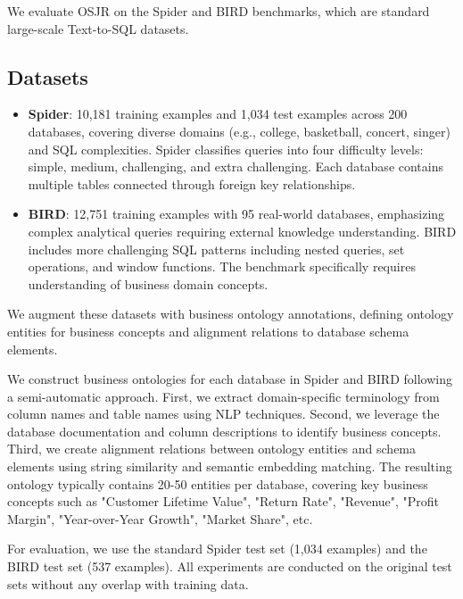 \documentclass[sigconf, nonatbib]{acmart}
\begin{document}
We evaluate OSJR on the Spider and BIRD benchmarks, which are standard large-scale Text-to-SQL datasets.

\subsection{Datasets}

\begin{itemize}
    \item \textbf{Spider}: 10,181 training examples and 1,034 test examples across 200 databases, covering diverse domains (e.g., college, basketball, concert, singer) and SQL complexities. Spider classifies queries into four difficulty levels: simple, medium, challenging, and extra challenging. Each database contains multiple tables connected through foreign key relationships.
    
    \item \textbf{BIRD}: 12,751 training examples with 95 real-world databases, emphasizing complex analytical queries requiring external knowledge understanding. BIRD includes more challenging SQL patterns including nested queries, set operations, and window functions. The benchmark specifically requires understanding of business domain concepts.
\end{itemize}

We augment these datasets with business ontology annotations, defining ontology entities for business concepts and alignment relations to database schema elements.

We construct business ontologies for each database in Spider and BIRD following a semi-automatic approach. First, we extract domain-specific terminology from column names and table names using NLP techniques. Second, we leverage the database documentation and column descriptions to identify business concepts. Third, we create alignment relations between ontology entities and schema elements using string similarity and semantic embedding matching. The resulting ontology typically contains 20-50 entities per database, covering key business concepts such as "Customer Lifetime Value", "Return Rate", "Revenue", "Profit Margin", "Year-over-Year Growth", "Market Share", etc.

For evaluation, we use the standard Spider test set (1,034 examples) and the BIRD test set (537 examples). All experiments are conducted on the original test sets without any overlap with training data.

\begin{table}[t]
    \caption{Dataset Statistics}
    \label{tab:dataset_stats}
    \centering
\end{table}
\end{document}
